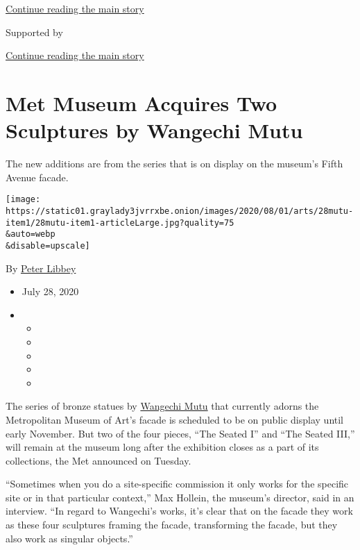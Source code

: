 \protect\hyperlink{after-top}{Continue reading the main story}

Supported by

\protect\hyperlink{after-sponsor}{Continue reading the main story}

\hypertarget{met-museum-acquires-two-sculptures-by-wangechi-mutu}{%
\section{Met Museum Acquires Two Sculptures by Wangechi
Mutu}\label{met-museum-acquires-two-sculptures-by-wangechi-mutu}}

The new additions are from the series that is on display on the museum's
Fifth Avenue facade.

\texttt{[image: https://static01.graylady3jvrrxbe.onion/images/2020/08/01/arts/28mutu-item1/28mutu-item1-articleLarge.jpg?quality=75\\\&auto=webp\\\&disable=upscale]}

By \href{https://www.nytimes3xbfgragh.onion/by/peter-libbey}{Peter
Libbey}

\begin{itemize}
\item
  July 28, 2020
\item
  \begin{itemize}
  \item
  \item
  \item
  \item
  \item
  \end{itemize}
\end{itemize}

The series of bronze statues by
\href{https://www.nytimes3xbfgragh.onion/2018/06/20/t-magazine/wangechi-mutu.html}{Wangechi
Mutu} that currently adorns the Metropolitan Museum of Art's facade is
scheduled to be on public display until early November. But two of the
four pieces, ``The Seated I'' and ``The Seated III,'' will remain at the
museum long after the exhibition closes as a part of its collections,
the Met announced on Tuesday.

``Sometimes when you do a site-specific commission it only works for the
specific site or in that particular context,'' Max Hollein, the museum's
director, said in an interview. ``In regard to Wangechi's works, it's
clear that on the facade they work as these four sculptures framing the
facade, transforming the facade, but they also work as singular
objects.''


